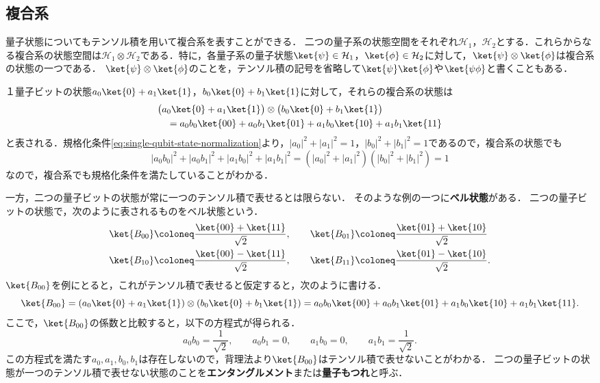 \subsection{複合系}

量子状態についてもテンソル積を用いて複合系を表すことができる．
二つの量子系の状態空間をそれぞれ$\mathcal H_1$，$\mathcal H_2$とする．これらからなる複合系の状態空間は$\mathcal H_1\otimes\mathcal H_2$である．特に，各量子系の量子状態$\ket{\psi}\in\mathcal H_1$，$\ket{\phi}\in\mathcal H_2$に対して，$\ket{\psi}\otimes\ket{\phi}$は複合系の状態の一つである．
$\ket{\psi}\otimes\ket{\phi}$のことを，テンソル積の記号を省略して$\ket{\psi}\ket{\phi}$や$\ket{\psi\phi}$と書くこともある．

１量子ビットの状態$a_0\ket{0}+a_1\ket{1}$，$b_0\ket{0}+b_1\ket{1}$に対して，それらの複合系の状態は
\begin{align*}
   & \big(a_0\ket{0}+a_1\ket{1}\big)\otimes\big(b_0\ket{0}+b_1\ket{1}\big) \\
   & \quad = a_0b_0\ket{00}+a_0b_1\ket{01}+a_1b_0\ket{10}+a_1b_1\ket{11}
\end{align*}
と表される．規格化条件\eqref{eq:single-qubit-state-normalization}より，$|a_0|^2+|a_1|^2=1$，$|b_0|^2+|b_1|^2=1$であるので，複合系の状態でも
\[
  |a_0b_0|^2+|a_0b_1|^2+|a_1b_0|^2+|a_1b_1|^2
  =(|a_0|^2+|a_1|^2)(|b_0|^2+|b_1|^2)=1
\]
なので，複合系でも規格化条件を満たしていることがわかる．

一方，二つの量子ビットの状態が常に一つのテンソル積で表せるとは限らない．
そのような例の一つに\textbf{ベル状態}がある．
二つの量子ビットの状態で，次のように表されるものをベル状態という．
\begin{equation*}
  \begin{aligned}
     & \ket{B_{00}}\coloneq\frac{\ket{00}+\ket{11}}{\sqrt{2}}, \qquad
    \ket{B_{01}}\coloneq\frac{\ket{01}+\ket{10}}{\sqrt{2}}            \\
     & \ket{B_{10}}\coloneq\frac{\ket{00}-\ket{11}}{\sqrt{2}}, \qquad
    \ket{B_{11}}\coloneq\frac{\ket{01}-\ket{10}}{\sqrt{2}}.
  \end{aligned}
\end{equation*}
$\ket{B_{00}}$を例にとると，これがテンソル積で表せると仮定すると，次のように書ける．
\[
  \ket{B_{00}}=(a_0\ket{0}+a_1\ket{1})\otimes(b_0\ket{0}+b_1\ket{1})
  =a_0b_0\ket{00}+a_0b_1\ket{01}+a_1b_0\ket{10}+a_1b_1\ket{11}.
\]
ここで，$\ket{B_{00}}$の係数と比較すると，以下の方程式が得られる．
\[
  a_0b_0=\frac{1}{\sqrt2},\qquad
  a_0b_1=0,\qquad
  a_1b_0=0,\qquad
  a_1b_1=\frac{1}{\sqrt2}.
\]
この方程式を満たす$a_0,a_1,b_0,b_1$は存在しないので，背理法より$\ket{B_{00}}$はテンソル積で表せないことがわかる．
二つの量子ビットの状態が一つのテンソル積で表せない状態のことを\textbf{エンタングルメント}または\textbf{量子もつれ}と呼ぶ．

